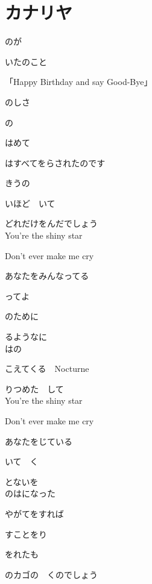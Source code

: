 \section{ カナリヤ}
\large{

のが

いたのこと

「Happy Birthday and say Good-Bye」

のしさ

の

はめて

はすべてをらされたのです

きうの

いほど　いて

どれだけをんだでしょう
\\

You're the shiny star

Don't ever make me cry

あなたをみんなってる

ってよ

のために

るようなに
\\

はの

こえてくる　Nocturne

りつめた　して
\\

You're the shiny star

Don't ever make me cry

あなたをじている

いて　く

とないを
\\

のはになった

やがてをすれば

すことをり

をれたも

のカゴの　くのでしょう

}